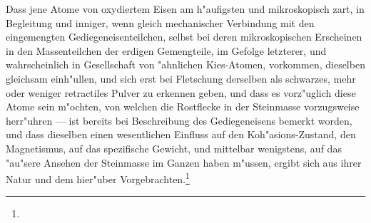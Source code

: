 \documentclass[a4paper, 11pt, oneside, german]{article}
\begin{document}
Dass jene Atome von oxydiertem Eisen am h"aufigsten und mikroskopisch zart, in Begleitung und inniger, wenn gleich mechanischer Verbindung mit den eingemengten Gediegeneisenteilchen, selbst bei deren mikroskopischen Erscheinen in den Massenteilchen der erdigen Gemengteile, im Gefolge letzterer, und wahrscheinlich in Gesellschaft von "ahnlichen Kies-Atomen, vorkommen, dieselben gleichsam einh"ullen, und sich erst bei Fletschung derselben als schwarzes, mehr oder weniger retractiles Pulver zu erkennen geben, und dass es vorz"uglich diese Atome sein m"ochten, von welchen die Rostflecke in der Steinmasse vorzugsweise herr"uhren --- ist bereits bei Beschreibung des Gediegeneisens bemerkt worden, und dass dieselben einen wesentlichen Einfluss auf den Koh"asions-Zustand, den Magnetismus, auf das spezifische Gewicht, und mittelbar wenigstens, auf das "au"sere Ansehen der Steinmasse im Ganzen haben m"ussen, ergibt sich aus ihrer Natur und dem hier"uber Vorgebrachten.\footnote{}
\end{document}
